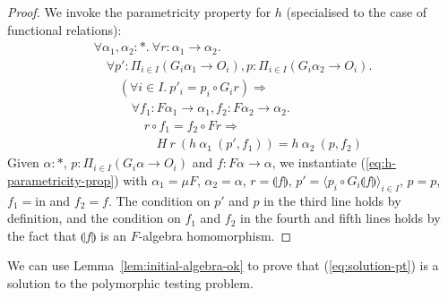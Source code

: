 \documentclass{article}[12 pt]
\newcommand{\fold}[1]{\llparenthesis #1 \rrparenthesis}
\theoremstyle{problemstyle}
\begin{document}
\begin{proof}
  We invoke the parametricity property for $h$ (specialised to the case
  of functional relations):
  \begin{equation}
    \label{eq:h-parametricity-prop}
    \begin{array}{l}
      \forall \alpha_1, \alpha_2 : *.~\forall r : \alpha_1 \to \alpha_2. \\
      \quad \forall p' : \Pi_{i \in I}(G_i\alpha_1 \to O_i), p :
      \Pi_{i \in I}(G_i\alpha_2 \to O_i). \\ 
      \quad\quad (\forall i \in I.~p'_i = p_i \circ G_i r) \Rightarrow \\
      \quad\quad\quad \forall f_1 : F\alpha_1 \to \alpha_1, f_2 :
      F\alpha_2 \to \alpha_2. \\ 
      \quad\quad\quad\quad r \circ f_1 = f_2 \circ F r \Rightarrow \\
      \quad\quad\quad\quad\quad H~r~(h~\alpha_1~(p',f_1)) =
      h~\alpha_2~(p,f_2) 
    \end{array}
  \end{equation}
  Given $\alpha : *$, $p : \Pi_{i \in I} (G_i\alpha \to O_i)$ and $f :
  F\alpha \to \alpha$, we instantiate (\ref{eq:h-parametricity-prop})
  with $\alpha_1 = \mu F$, $\alpha_2 = \alpha$, $r = \fold{f}$, $p' =
  \langle p_i \circ G_i \fold{f} \rangle_{i \in I}$, $p = p$, $f_1 =
  \mathrm{in}$ and $f_2 = f$. The condition on $p'$ and $p$ in the
  third line holds by definition, and the condition on $f_1$ and $f_2$
  in the fourth and fifth lines holds by the fact that $\fold{f}$ is
  an $F$-algebra homomorphism.
\end{proof}

We can use Lemma~\ref{lem:initial-algebra-ok} to prove that
(\ref{eq:solution-pt}) is a solution to the polymorphic testing
problem.
\end{document}
